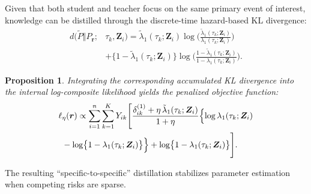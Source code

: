 \documentclass{article}
\theoremstyle{plain}
\newtheorem{proposition}[theorem]{Proposition}
\theoremstyle{definition}
\theoremstyle{remark}
\begin{document}
Given that both student and teacher focus on the same primary event of interest, knowledge can be distilled through the discrete-time hazard-based KL divergence:
\begin{align*}
d(\tilde{P} \Vert P_{\boldsymbol r}; & \tau_k, \bm Z_i)
=
\tilde{\lambda}_{1}(\tau_k; \bm Z_i)
\log\!\Biggl(
\frac{\tilde{\lambda}_{1}(\tau_k; \bm Z_i)}
     {\lambda_{1}(\tau_k; \bm Z_i)}
\Biggr)
\\
&+
\bigl\{1-\tilde{\lambda}_{1}(\tau_k; \bm Z_i)\bigr\}
\log\!\Biggl(
\frac{1-\tilde{\lambda}_{1}(\tau_k; \bm Z_i)}
     {1-\lambda_{1}(\tau_k; \bm Z_i)}
\Biggr).
\end{align*}

\begin{proposition}
  \label{prop5}
Integrating the corresponding accumulated KL divergence into the internal log-composite likelihood yields the penalized objective function:
\begin{align}
    \ell&_{\eta}(\boldsymbol r)
    \propto
    \sum_{i=1}^n\sum_{k=1}^K Y_{ik} \Bigg[\frac{\delta_{ik}^{(1)}+\eta\,\tilde{\lambda}_1(\tau_k;\bm Z_i)}{1+\eta}
    \Bigl\{\log \lambda_1(\tau_k;\bm Z_i) \nonumber\\
    &
    - \log\bigl\{1-\lambda_1(\tau_k;\bm Z_i)\bigr\}\Bigr\}
    + \log\bigl\{1-\lambda_1(\tau_k;\bm Z_i)\bigr\}
    \Bigg].  
    \label{log l prior hazard}
\end{align}
\end{proposition}
The resulting ``specific-to-specific'' distillation stabilizes parameter estimation when competing risks are sparse. 
\end{document}
